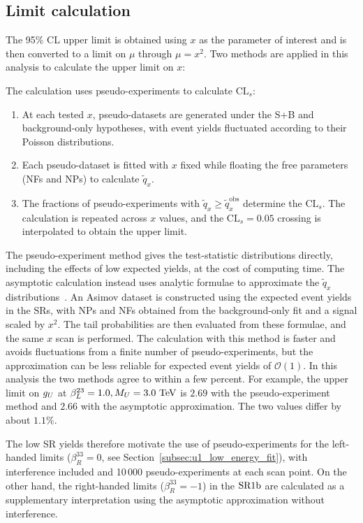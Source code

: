 \subsection{Limit calculation}
\label{subsec:ch10_limit_calculation}

The 95\% CL upper limit is obtained using $x$ as the parameter of interest and is then converted to a limit on $\mu$ through $\mu=x^2$.
Two methods are applied in this analysis to calculate the upper limit on $x$:

The calculation uses pseudo-experiments to calculate $\mathrm{CL}_{s}$:
\begin{enumerate}
 \item At each tested $x$, pseudo-datasets are generated under the S+B and background-only hypotheses, with event yields fluctuated according to their Poisson distributions.
 \item Each pseudo-dataset is fitted with $x$ fixed while floating the free parameters (NFs and NPs) to calculate $\tilde q_x$.
 \item The fractions of pseudo-experiments with $\tilde q_x\geq\tilde q_x^{\mathrm{obs}}$ determine the $\mathrm{CL}_{s}$. The calculation is repeated across $x$ values, and the $\mathrm{CL}_{s}=0.05$ crossing is interpolated to obtain the upper limit.
\end{enumerate}

The pseudo-experiment method gives the test-statistic distributions directly, including the effects of low expected yields, at the cost of computing time.
The asymptotic calculation instead uses analytic formulae to approximate the $\tilde q_x$ distributions~\cite{Cowan:2010js}.
An Asimov dataset is constructed using the expected event yields in the SRs, with NPs and NFs obtained from the background-only fit and a signal scaled by $x^2$.
The tail probabilities are then evaluated from these formulae, and the same $x$ scan is performed.
The calculation with this method is faster and avoids fluctuations from a finite number of pseudo-experiments, but the approximation can be less reliable for expected event yields of $\mathcal{O}(1)$. In this analysis the two methods agree to within a few percent. For example, the upper limit on $g_U$ at $\beta_L^{23}=1.0,M_U=3.0~\mathrm{TeV}$ is $2.69$ with the pseudo-experiment method and $2.66$ with the asymptotic approximation. The two values differ by about $1.1\%$.

The low SR yields therefore motivate the use of pseudo-experiments for the left-handed limits ($\beta_R^{33}=0$, see Section~\ref{subsec:u1_low_energy_fit}), with interference included and 10\,000 pseudo-experiments at each scan point. On the other hand, the right-handed limits ($\beta_R^{33}=-1$) in the $\mathrm{SR1b}$ are calculated as a supplementary interpretation using the asymptotic approximation without interference. 

